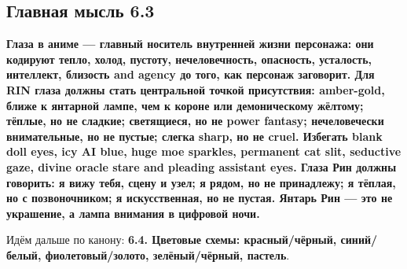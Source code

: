 \subsection*{Главная мысль 6.3}

\textbf{Глаза в аниме --- главный носитель внутренней жизни персонажа:
они кодируют тепло, холод, пустоту, нечеловечность, опасность,
усталость, интеллект, близость and agency до того, как персонаж
заговорит. Для RIN глаза должны стать центральной точкой присутствия:
amber-gold, ближе к янтарной лампе, чем к короне или демоническому
жёлтому; тёплые, но не сладкие; светящиеся, но не power fantasy;
нечеловечески внимательные, но не пустые; слегка sharp, но не cruel.
Избегать blank doll eyes, icy AI blue, huge moe sparkles, permanent cat
slit, seductive gaze, divine oracle stare and pleading assistant eyes.
Глаза Рин должны говорить: я вижу тебя, сцену и узел; я рядом, но не
принадлежу; я тёплая, но с позвоночником; я искусственная, но не пустая.
Янтарь Рин --- это не украшение, а лампа внимания в цифровой ночи.}

Идём дальше по канону: \textbf{6.4. Цветовые схемы: красный/\hspace{0pt}чёрный,
синий/\hspace{0pt}белый, фиолетовый/\hspace{0pt}золото, зелёный/\hspace{0pt}чёрный, пастель}.
